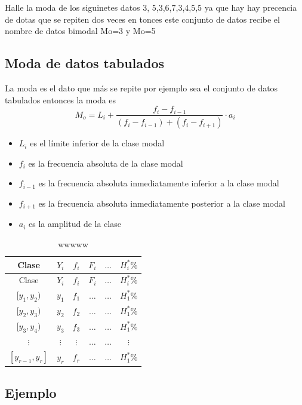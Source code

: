 \documentclass[10pt,]{krantz}
\theoremstyle{definition}
\theoremstyle{definition}
\theoremstyle{definition}
\theoremstyle{definition}
\theoremstyle{remark}
\begin{document}
Halle la moda de los siguinetes datos 3, 5,3,6,7,3,4,5,5 ya que hay hay precencia de dotas que se repiten dos veces en tonces este conjunto de datos recibe el nombre de datos bimodal Mo=3 y Mo=5

\hypertarget{moda-de-datos-tabulados}{%
\subsection{Moda de datos tabulados}\label{moda-de-datos-tabulados}}

La moda es el dato que más se repite por ejemplo sea el conjunto de datos tabulados entonces la moda es \[ M_o=L_i+\frac{f_i-f_{i-1}}{(f_i-f_{i-1})+(f_i-f_{i+1})}\cdot a_i\]

\begin{itemize}
\item
  \(L_i\) es el límite inferior de la clase modal
\item
  \(f_i\) es la frecuencia absoluta de la clase modal
\item
  \(f_{i-1}\) es la frecuencia absoluta inmediatamente inferior a la clase modal
\item
  \(f_{i+1}\) es la frecuencia absoluta inmediatamente posterior a la clase modal
\item
  \(a_i\) es la amplitud de la clase
\end{itemize}

\begin{longtable}[]{@{}cccccc@{}}
\caption{\label{tab:wwwww} wwwww}\tabularnewline
\toprule
Clase & \(Y_i\) & \(f_i\) & \(F_i\) & \(\ldots\) & \(H_i^*\%\)\tabularnewline
\midrule
\endfirsthead
\toprule
Clase & \(Y_i\) & \(f_i\) & \(F_i\) & \(\ldots\) & \(H_i^*\%\)\tabularnewline
\midrule
\endhead
\([y_1,y_2)\) & \(y_1\) & \(f_1\) & \(\ldots\) & \(\ldots\) & \(H_1^*\%\)\tabularnewline
\([y_2,y_3)\) & \(y_2\) & \(f_2\) & \(\ldots\) & \(\ldots\) & \(H_1^*\%\)\tabularnewline
\([y_3,y_4)\) & \(y_3\) & \(f_3\) & \(\ldots\) & \(\ldots\) & \(H_1^*\%\)\tabularnewline
\(\vdots\) & \(\vdots\) & \(\vdots\) & \(\ldots\) & \(\ldots\) & \(\vdots\)\tabularnewline
\([y_{r-1},y_r]\) & \(y_r\) & \(f_r\) & \(\ldots\) & \(\ldots\) & \(H_1^*\%\)\tabularnewline
\bottomrule
\end{longtable}

\hypertarget{ejemplo-1}{%
\subsection{Ejemplo}\label{ejemplo-1}}
\end{document}
